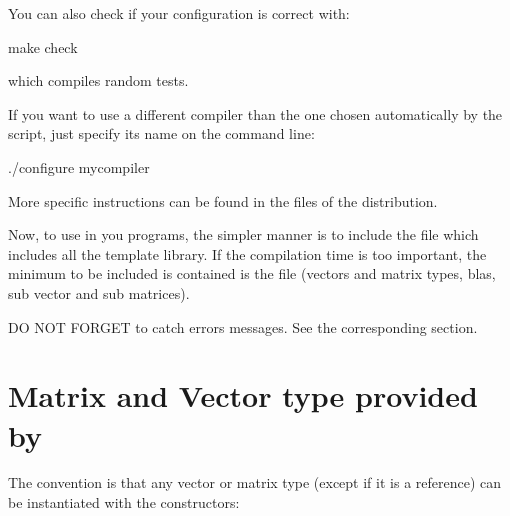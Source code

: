 \documentclass[a4paper,11pt,english]{sphinxmanual}
\begin{document}
You can also check if your configuration is correct with:

\begin{sphinxVerbatim}[commandchars=\\\{\}]
make check
\end{sphinxVerbatim}

which compiles random tests.

If you want to use a different compiler than the one chosen
automatically by the  script, just specify its
name on the command line:

\begin{sphinxVerbatim}[commandchars=\\\{\}]
./configure mycompiler
\end{sphinxVerbatim}

More specific instructions can be found in the  files of
the distribution.

Now, to use  in you programs, the simpler manner is to include the file  which includes all the template library. If the compilation time is too important, the minimum to be included is contained is the file  (vectors and matrix types, blas, sub vector and sub matrices).

DO NOT FORGET to catch errors messages. See the corresponding section.


\chapter{Matrix and Vector type provided by }
\label{\detokenize{gmm/matrix:matrix-and-vector-type-provided-by-gmm}}\label{\detokenize{gmm/matrix:gmm-matrix}}\label{\detokenize{gmm/matrix::doc}}
The convention is that any vector or matrix type (except if it is a  reference)
can be instantiated with the constructors:

\begin{sphinxVerbatim}[commandchars=\\\{\}]
         
       
\end{sphinxVerbatim}
\end{document}
